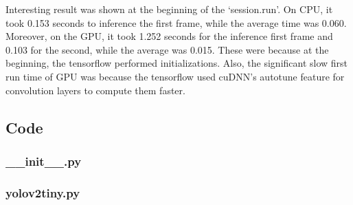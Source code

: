 \documentclass[a4paper,12pt]{article}
\begin{document}
Interesting result was shown at the beginning of the ‘session.run’. On CPU, it took 0.153 seconds to inference the first frame, while the average time was 0.060.
Moreover, on the GPU, it took 1.252 seconds for the inference first frame and 0.103 for the second, while the average was 0.015.
These were because at the beginning, the tensorflow performed initializations. Also, the significant slow first run time of GPU was because the tensorflow used cuDNN’s autotune feature for convolution layers to compute them faster.  


\subsection{Code}
\subsubsection{\_\_init\_\_.py}

\subsubsection{yolov2tiny.py}

\end{document}
